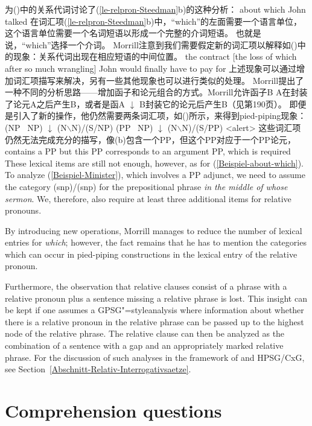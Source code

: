 \citet[]{Morrill95a}为()中的关系代词讨论了(\ref{le-relpron-Steedman}b)的这种分析：
\ea
\label{Beispiel-about-which}
about which John talked
\z
在词汇项(\ref{le-relpron-Steedman}b)中，``{which}''的左面需要一个语言单位，这个语言单位需要一个名词短语以形成一个完整的介词短语。
也就是说，``{which}''选择一个介词。
Morrill注意到我们需要假定新的词汇项以解释如()中的现象：关系代词出现在相应短语的中间位置。
\ea
the contract [the loss of which after so much wrangling] John would finally have to pay for
\z
上述现象可以通过增加词汇项描写来解决，另有一些其他现象也可以进行类似的处理。
Morrill提出了一种不同的分析思路——增加函子和论元组合的方式。Morrill允许函子B \up\is{$\uparrow$} A在封装了论元A之后产生B，或者是函A $\downarrow$\is{$\downarrow$} B封装它的论元后产生B（见第190页）。
即便是引入了新的操作，他仍然需要两条词汇项，如()所示，来得到pied-piping现象：
\eal
\ex (NP \up\ NP) $\downarrow$ (N$\backslash$N)/(S/NP)
\ex (PP \up\ NP) $\downarrow$ (N$\backslash$N)/(S/PP)
\zl
<alert>
这些词汇项仍然无法完成充分的描写，像(b)包含一个PP，但这个PP对应于一个PP论元， contains a PP but this PP corresponds to an argument PP, which is required
These lexical items are still not enough, however, as 
for (\ref{Beispiel-about-which}). To analyze (\ref{Beispiel-Minister}), which involves a PP adjunct, we need to assume the category (s\bs np)/(s\bs np)  for the prepositional
phrase \emph{in the middle of whose sermon}. We, therefore, also require at least three additional items for relative pronouns.

By introducing new operations, Morrill manages to reduce the number of lexical entries for \emph{which}; however, the fact remains
that he has to mention the categories which can occur in pied-piping constructions in the lexical entry of the relative pronoun.

Furthermore, the observation that relative clauses consist of a phrase with a relative pronoun plus a sentence missing a relative phrase
is lost. This insight can be kept if one assumes a GPSG"=style\indexgpsg analysis where information about whether there is a relative pronoun
in the relative phrase can be passed up to the highest node of the relative phrase.
The relative clause can then be analyzed as the combination of a sentence with a gap and an appropriately marked relative phrase.
For the discussion of such analyses in the framework of \gbt and HPSG/CxG, see Section~\ref{Abschnitt-Relativ-Interrogativsaetze}.

\section*{Comprehension questions}

